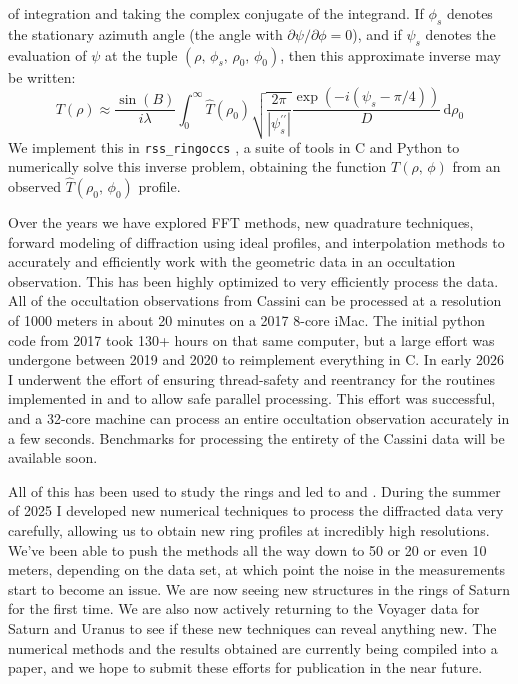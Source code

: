 \documentclass{article}
\begin{document}
        of integration and taking the complex conjugate of the integrand.
        If $\phi_{s}$ denotes the stationary azimuth angle
        (the angle with $\partial\psi/\partial\phi=0$), and if $\psi_{s}$
        denotes the evaluation of $\psi$ at the tuple
        $(\rho,\,\phi_{s},\,\rho_{0},\,\phi_{0})$, then this approximate inverse
        may be written:
        \begin{equation}
            T(\rho)
            \approx
            \frac{\sin(B)}{i\lambda}
            \int_{0}^{\infty}
                \hat{T}(\rho_{0})
                \sqrt{\frac{2\pi}{|\psi_{s}^{\prime\prime}|}}
                \frac{\exp\left(-i(\psi_{s}-\pi/4)\right)}{D}\,
                    \textrm{d}\rho_{0}
        \end{equation}
        We implement this in \texttt{rss\_ringoccs}
        \cite{rssringoccs}, a suite of tools in C and
        Python to numerically solve this inverse problem,
        obtaining the function $T(\rho,\,\phi)$ from an observed
        $\hat{T}(\rho_{0},\,\phi_{0})$ profile.
        \par\hfill\par
        Over the years we have explored
        FFT methods, new quadrature techniques, forward modeling of diffraction
        using ideal profiles, and interpolation methods to accurately and
        efficiently work with the geometric data in an occultation observation.
        This has been highly optimized to very efficiently process the data.
        All of the occultation observations from Cassini
        can be processed at a resolution of 1000 meters in about 20 minutes on
        a 2017 8-core iMac. The initial python code from 2017 took 130+
        hours on that same computer, but a large effort was undergone between
        2019 and 2020 to reimplement everything in C.
        In early 2026 I underwent the effort of ensuring
        thread-safety and reentrancy for the routines implemented in
        \cite{libtmpl} and \cite{rssringoccs} to allow safe parallel processing.
        This effort was successful, and a 32-core machine can process an entire
        occultation observation accurately in a few seconds.
        Benchmarks for processing the entirety of the Cassini data will be
        available soon.
        \par\hfill\par
        All of this has been used to study the rings and led to
        \cite{FRENCH2023115678} and \cite{NICHOLSON2023115287}.
        During the summer of 2025 I developed new numerical techniques to
        process the diffracted data very carefully, allowing us to obtain new
        ring profiles at incredibly high resolutions. We've been able to push
        the methods all the way down to 50 or 20 or even 10 meters, depending on the
        data set, at which point the noise in the measurements start to become
        an issue. We are now seeing new
        structures in the rings of Saturn for the first time. We are also now
        actively returning to the Voyager data for Saturn and Uranus to
        see if these new techniques can reveal anything new. The numerical
        methods and the results obtained are currently being compiled into a
        paper, and we hope to submit these efforts for publication
        in the near future.
\end{document}
